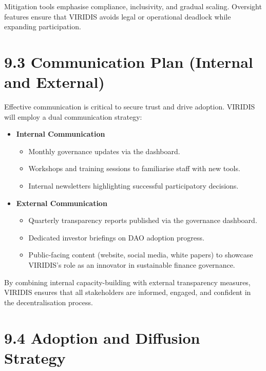 \documentclass[
  english,
  12pt,
  oneside,
  open=any]{scrbook}
\providecommand{\tightlist}{%
  \setlength{\itemsep}{0pt}\setlength{\parskip}{0pt}}\usepackage{longtable,booktabs,array}
\begin{document}
Mitigation tools emphasise compliance, inclusivity, and gradual scaling.
Oversight features ensure that VIRIDIS avoids legal or operational
deadlock while expanding participation.

\section{9.3 Communication Plan (Internal and
External)}\label{sec-comm-plan}

Effective communication is critical to secure trust and drive adoption.
VIRIDIS will employ a dual communication strategy:

\begin{itemize}
\tightlist
\item
  \textbf{Internal Communication}

  \begin{itemize}
  \tightlist
  \item
    Monthly governance updates via the dashboard.\\
  \item
    Workshops and training sessions to familiarise staff with new
    tools.\\
  \item
    Internal newsletters highlighting successful participatory
    decisions.
  \end{itemize}
\item
  \textbf{External Communication}

  \begin{itemize}
  \tightlist
  \item
    Quarterly transparency reports published via the governance
    dashboard.\\
  \item
    Dedicated investor briefings on DAO adoption progress.\\
  \item
    Public-facing content (website, social media, white papers) to
    showcase VIRIDIS's role as an innovator in sustainable finance
    governance.
  \end{itemize}
\end{itemize}

By combining internal capacity-building with external transparency
measures, VIRIDIS ensures that all stakeholders are informed, engaged,
and confident in the decentralisation process.

\section{9.4 Adoption and Diffusion Strategy}\label{sec-adoption}
\end{document}
